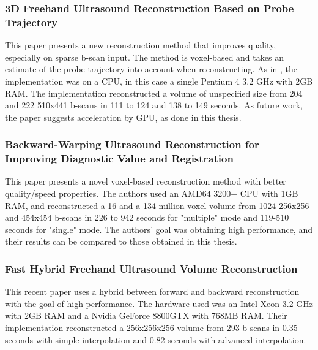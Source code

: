 	\subsubsection{3D Freehand Ultrasound Reconstruction Based on Probe Trajectory \cite{coupe2005}}
	
		This paper presents a new reconstruction method that improves quality, especially on sparse b-scan input. The method is voxel-based and takes an estimate of the probe trajectory into account when reconstructing. As in \cite{gobbi2002}, the implementation was on a CPU, in this case a single Pentium 4 3.2 GHz with 2GB RAM. The implementation reconstructed a volume of unspecified size from 204 and 222 510x441 b-scans in 111 to 124 and 138 to 149 seconds. As future work, the paper suggests acceleration by GPU, as done in this thesis.
		
	\subsubsection{Backward-Warping Ultrasound Reconstruction for Improving Diagnostic Value and Registration \cite{wein2006}}
	
		This paper presents a novel voxel-based reconstruction method with better quality/speed properties. The authors used an AMD64 3200+ CPU with 1GB RAM, and reconstructed a 16 and a 134 million voxel volume from 1024 256x256 and 454x454 b-scans in 226 to 942 seconds for "multiple" mode and 119-510 seconds for "single" mode. The authors' goal was obtaining high performance, and their results can be compared to those obtained in this thesis.
		
	\subsubsection{Fast Hybrid Freehand Ultrasound Volume Reconstruction \cite{karamalis2009}}
	
		This recent paper uses a hybrid between forward and backward reconstruction with the goal of high performance. The hardware used was an Intel Xeon 3.2 GHz with 2GB RAM and a Nvidia GeForce 8800GTX with 768MB RAM. Their implementation reconstructed a 256x256x256 volume from 293 b-scans in 0.35 seconds with simple interpolation and 0.82 seconds with advanced interpolation.


